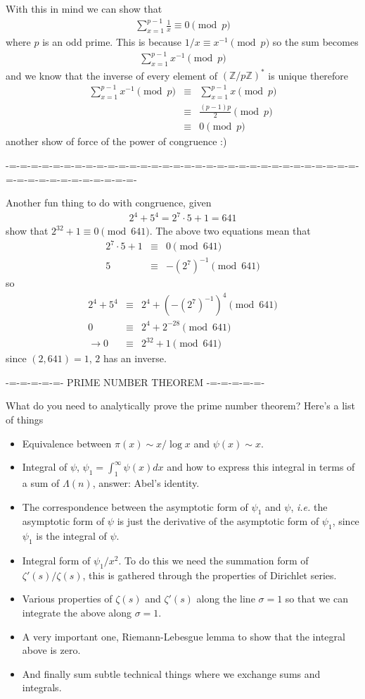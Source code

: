 \documentclass[aps,preprint,preprintnumbers,nofootinbib,showpacs,prd]{revtex4-1}
\newcommand{\ie}{{\it i.e.} }
\newcommand{\bit}{\begin{itemize}}
\newcommand{\eit}{\end{itemize}}
\newcommand{\nbea}{\begin{eqnarray*}}
\newcommand{\neea}{\end{eqnarray*}}
\begin{document}
With this in mind we can show that
%
\nbea
\sum_{x=1}^{p-1} \frac{1}{x} \equiv 0 \pmod{p}
\neea
%
where $p$ is an odd prime. This is because $1/x \equiv x^{-1} \pmod{p}$ so the sum becomes
%
\nbea
\sum_{x=1}^{p-1} x^{-1} \pmod{p}
\neea
%
and we know that the inverse of every element of $(\mathbb{Z}/p\mathbb{Z})^*$ is unique therefore
%
\nbea
\sum_{x=1}^{p-1} x^{-1} \pmod{p} & \equiv & \sum_{x=1}^{p-1} x \pmod{p} \\
& \equiv & \frac{(p-1)p}{2} \pmod{p} \\
& \equiv & 0 \pmod{p}
\neea
%
another show of force of the power of congruence :)

-=-=-=-=-=-=-=-=-=-=-=-=-=-=-=-=-=-=-=-=-=-=-=-=-=-=-=-=-=-=-=-=-=-=-=-=-=-=-=-=-=-=-=-=-

Another fun thing to do with congruence, given
%
\nbea
2^4 + 5^4 = 2^7\cdot 5 + 1 = 641
\neea
%
show that $2^{32} + 1 \equiv 0 \pmod {641}$. The above two equations mean that
%
\nbea
2^7\cdot 5 + 1 & \equiv & 0 \pmod{641} \\
5 & \equiv & -(2^7)^{-1} \pmod{641}
\neea
%
so
%
\nbea
2^4 + 5^4 & \equiv & 2^4 + ( -(2^7)^{-1})^4 \pmod{641} \\
0 & \equiv &  2^4 + 2^{-28} \pmod{641} \\
\to 0 & \equiv &  2^{32} + 1 \pmod{641} 
\neea
%
since $(2,641)=1$, $2$ has an inverse.


-=-=-=-=-=- PRIME NUMBER THEOREM -=-=-=-=-=-

What do you need to analytically prove the prime number theorem? Here's a list of things
%
\bit
%
\item Equivalence between $\pi(x) \sim x/\log x$ and $\psi(x) \sim x$.
%
\item Integral of $\psi$, $\psi_1 = \int_1^\infty \psi(x) dx$ and how to express this integral in terms of a sum of $\Lambda(n)$, answer: Abel's identity.
%
\item The correspondence between the asymptotic form of $\psi_1$ and $\psi$, \ie the asymptotic form of $\psi$ is just the derivative of the asymptotic form of $\psi_1$, since $\psi_1$ is the integral of $\psi$.
%
\item Integral form of $\psi_1/x^2$. To do this we need the summation form of $\zeta'(s)/\zeta(s)$, this is gathered through the properties of Dirichlet series.
%
\item Various properties of $\zeta(s)$ and $\zeta'(s)$ along the line $\sigma = 1$ so that we can integrate the above along $\sigma=1$.
%
\item A very important one, Riemann-Lebesgue lemma to show that the integral above is zero.
%
\item And finally sum subtle technical things where we exchange sums and integrals.
\eit
%
\end{document}
